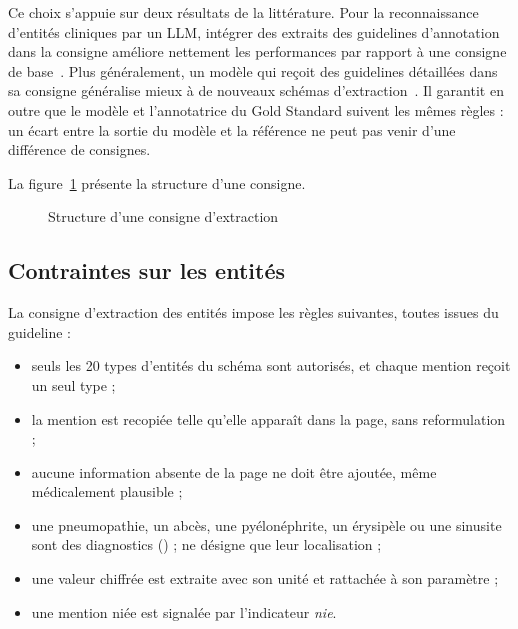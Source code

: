 Ce choix s'appuie sur deux résultats de la littérature. Pour la reconnaissance d'entités cliniques par un LLM, intégrer des extraits des guidelines d'annotation dans la consigne améliore nettement les performances par rapport à une consigne de base~\cite{hu2024clinicalner}. Plus généralement, un modèle qui reçoit des guidelines détaillées dans sa consigne généralise mieux à de nouveaux schémas d'extraction~\cite{sainz2024gollie}. Il garantit en outre que le modèle et l'annotatrice du Gold Standard suivent les mêmes règles : un écart entre la sortie du modèle et la référence ne peut pas venir d'une différence de consignes.

La figure~\ref{fig:c4-prompt} présente la structure d'une consigne. 

\begin{figure}[H]
\centering
\caption{Structure d'une consigne d'extraction}\label{fig:c4-prompt}
\end{figure}

\subsection{Contraintes sur les entités}\label{sec:c4-contraintes-entites}

La consigne d'extraction des entités impose les règles suivantes, toutes issues du guideline :
\begin{itemize}
  \item seuls les 20 types d'entités du schéma sont autorisés, et chaque mention reçoit un seul type ;
  \item la mention est recopiée telle qu'elle apparaît dans la page, sans reformulation ;
  \item aucune information absente de la page ne doit être ajoutée, même médicalement plausible ;
  \item une pneumopathie, un abcès, une pyélonéphrite, un érysipèle ou une sinusite sont des diagnostics () ;  ne désigne que leur localisation ;
  \item une valeur chiffrée est extraite avec son unité et rattachée à son paramètre ;
  \item une mention niée est signalée par l'indicateur \emph{nie}.
\end{itemize}

